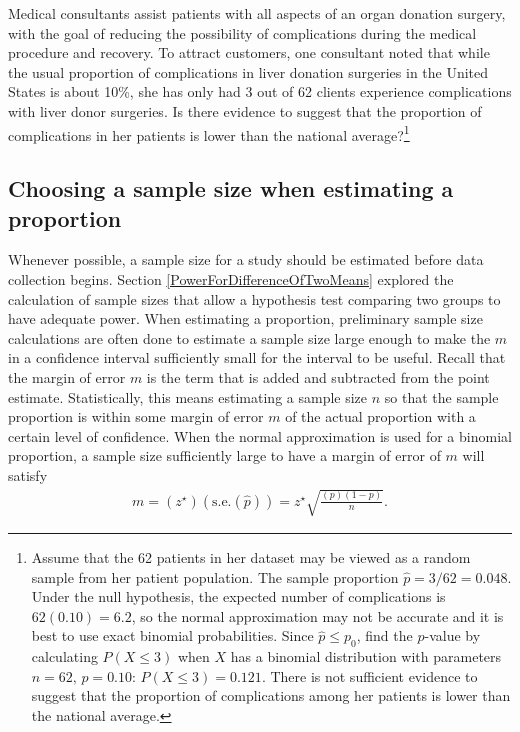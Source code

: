 \begin{exercise} Medical consultants assist patients with all aspects of an organ donation surgery, with the goal of reducing the possibility of complications during the medical procedure and recovery. To attract customers, one consultant noted that while the usual proportion of complications in liver donation surgeries in the United States is about 10\%, she has only had 3 out of 62 clients experience complications with liver donor surgeries. Is there evidence to suggest that the proportion of complications in her patients is lower than the national average?\footnote{Assume that the 62 patients in her dataset may be viewed as a random sample from her patient population. The sample proportion $\hat{p} = 3/62 = 0.048$. Under the null hypothesis, the expected number of complications is $62(0.10) = 6.2$, so the normal approximation may not be accurate and it is best to use exact binomial probabilities. Since $\hat{p} \leq p_0$, find the $p$-value by calculating $P(X \leq 3)$ when $X$ has a binomial distribution with parameters $n = 62,\, p = 0.10$: $P(X \leq 3) = 0.121$. There is not sufficient evidence to suggest that the proportion of complications among her patients is lower than the national average.}
\end{exercise}

\subsection{Choosing a sample size when estimating a proportion}


Whenever possible, a sample size for a study should be estimated before data collection begins.  Section \ref{PowerForDifferenceOfTwoMeans} explored the calculation of sample sizes that allow a hypothesis test comparing two groups to have adequate power.  When estimating a proportion, preliminary sample size calculations are often done to estimate a sample size large enough to make the  $m$ in a confidence interval sufficiently small for the interval to be useful. Recall that the margin of error $m$ is the term that is added and subtracted from the point estimate.  Statistically, this means estimating a sample size $n$ so that the sample proportion is within some margin of error $m$ of the actual proportion with a certain level of confidence. When the normal approximation is used for a binomial proportion, a sample size sufficiently large to have a margin of error of $m$ will satisfy 
\begin{align*}
 m = (z^{\star})(\text{s.e.}(\hat{p})) = z^{\star} \sqrt{\frac{(p)(1 - p)}{n}}. 
\end{align*}

